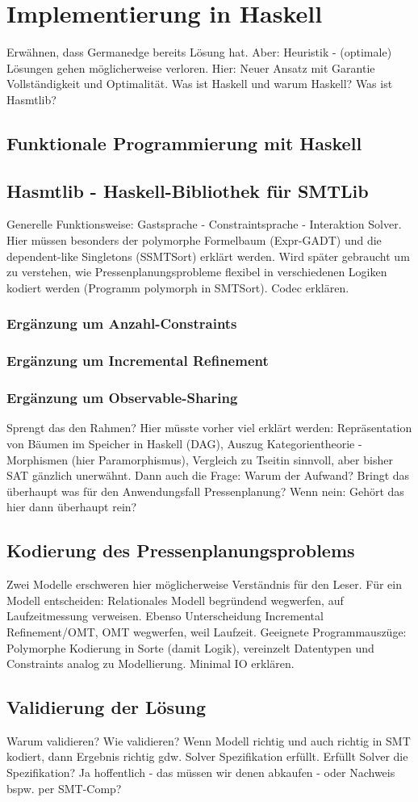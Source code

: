 \chapter{Implementierung in Haskell}
\label{chapter:implementierung}
Erwähnen, dass Germanedge bereits Lösung hat.
Aber: Heuristik - (optimale) Lösungen gehen möglicherweise verloren.
Hier: Neuer Ansatz mit Garantie Vollständigkeit und Optimalität.
Was ist Haskell und warum Haskell?
Was ist Hasmtlib?

\section{Funktionale Programmierung mit Haskell}

\section{Hasmtlib - Haskell-Bibliothek für SMTLib}
Generelle Funktionsweise: Gastsprache - Constraintsprache - Interaktion Solver.
Hier müssen besonders der polymorphe Formelbaum (Expr-GADT) und die dependent-like Singletons (SSMTSort) erklärt werden.
Wird später gebraucht um zu verstehen, wie Pressenplanungsprobleme flexibel in verschiedenen Logiken kodiert werden (Programm polymorph in SMTSort).
Codec erklären.

\subsection{Ergänzung um Anzahl-Constraints}

\subsection{Ergänzung um Incremental Refinement}

\subsection{Ergänzung um Observable-Sharing}
Sprengt das den Rahmen?
Hier müsste vorher viel erklärt werden:
Repräsentation von Bäumen im Speicher in Haskell (DAG),
Auszug Kategorientheorie - Morphismen (hier Paramorphismus),
Vergleich zu Tseitin sinnvoll, aber bisher SAT gänzlich unerwähnt.
Dann auch die Frage: Warum der Aufwand?
Bringt das überhaupt was für den Anwendungsfall Pressenplanung?
Wenn nein: Gehört das hier dann überhaupt rein?

\section{Kodierung des Pressenplanungsproblems}
Zwei Modelle erschweren hier möglicherweise Verständnis für den Leser.
Für ein Modell entscheiden: Relationales Modell begründend wegwerfen, auf Laufzeitmessung verweisen.
Ebenso Unterscheidung Incremental Refinement/OMT, OMT wegwerfen, weil Laufzeit.
Geeignete Programmauszüge: Polymorphe Kodierung in Sorte (damit Logik), vereinzelt Datentypen und Constraints analog zu Modellierung.
Minimal IO erklären.

\section{Validierung der Lösung}
Warum validieren?
Wie validieren?
Wenn Modell richtig und auch richtig in SMT kodiert, dann Ergebnis richtig gdw. Solver Spezifikation erfüllt.
Erfüllt Solver die Spezifikation? Ja hoffentlich - das müssen wir denen abkaufen - oder Nachweis bspw. per SMT-Comp?